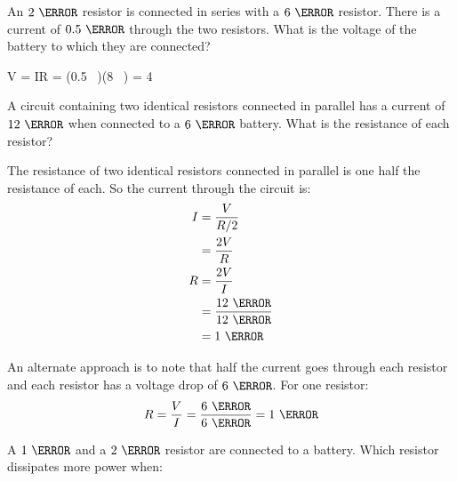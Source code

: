 \documentclass[fleqn,addpoints]{exam}
\begin{document}
\begin{questions}
\question[5]
An $2 \ \ohm$ resistor is connected in series with a $6 \ \ohm$ resistor.  There is a current of $0.5 \ \ampere$
through the two resistors.  What is the voltage of the battery to which they are connected?

\begin{solution}
  V = IR = (0.5 \ \ampere)(8 \ \ohm) = 4 \ \ampere
\end{solution}

\question[5]
A circuit containing two identical resistors connected in parallel has a current of $12 \ \ampere$ when connected to a
$6 \ \volt$ battery.  What is the resistance of each resistor?

\begin{solution}
The resistance of two identical resistors connected in parallel is one half the resistance of each.  So the current
through the circuit is:
\begin{align*}
  I &= \frac{V}{R/2} \\
    &= \frac{2V}{R} \\
  R &= \frac{2V}{I} \\
    &= \frac{12 \ \volt}{12 \ \ampere} \\
    &= 1 \ \ohm
\end{align*}

An alternate approach is to note that half the current goes through each resistor and each resistor has a voltage drop
of $6 \ \volt$.  For one resistor:
\[
  R = \frac{V}{I} = \frac{6 \ \volt}{6 \ \ampere} = 1 \ \ohm
\]

\end{solution}

\question
A $1 \ \ohm$ and a $2 \ \ohm$ resistor are connected to a battery.  Which resistor dissipates more power when:


\end{questions}
\end{document}
